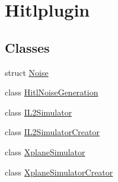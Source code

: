\hypertarget{group__hitlplugin}{\section{Hitlplugin}
\label{group__hitlplugin}
}
\subsection*{Classes}
\begin{DoxyCompactItemize}
\item 
struct \hyperlink{struct_noise}{Noise}
\item 
class \hyperlink{class_hitl_noise_generation}{Hitl\-Noise\-Generation}
\item 
class \hyperlink{class_i_l2_simulator}{I\-L2\-Simulator}
\item 
class \hyperlink{class_i_l2_simulator_creator}{I\-L2\-Simulator\-Creator}
\item 
class \hyperlink{class_xplane_simulator}{Xplane\-Simulator}
\item 
class \hyperlink{class_xplane_simulator_creator}{Xplane\-Simulator\-Creator}
\end{DoxyCompactItemize}
